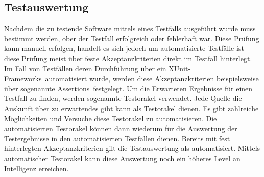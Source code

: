 \subsection{Testauswertung}
\label{subsec:testauswertung}
Nachdem die zu testende Software mittels eines Testfalls ausgeführt wurde muss bestimmt werden, ober der Testfall erfolgreich oder fehlerhaft war. Diese Prüfung kann manuell erfolgen, handelt es sich jedoch um automatisierte Testfälle ist diese Prüfung meist über feste Akzeptanzkriterien direkt im Testfall hinterlegt. Im Fall von Testfällen deren Durchführung über ein \grq XUnit-Frameworks\grq\ automatisiert wurde, werden diese Akzeptanzkriterien beispielsweise über sogenannte \grq Assertions\grq\ festgelegt.
Um die Erwarteten Ergebnisse für einen Testfall zu finden, werden sogenannte Testorakel verwendet.
Jede Quelle die Auskunft über zu erwartendes gibt kann als Testorakel dienen.
Es gibt zahlreiche Möglichkeiten und Versuche diese Testorakel zu automatisieren. \cite{memon_automated_2000} \cite{richardson_specification-based_1992} \cite{shahamiri_comparative_2009}
Die automatisierten Testorakel können dann wiederum für die Auswertung der Testergebnisse in den automatisierten Testfällen dienen.
Bereits mit fest hinterlegten Akzeptanzkriterien gilt die Testauswertung als automatisiert. Mittels automatischer Testorakel kann diese Auswertung noch ein höheres Level an Intelligenz erreichen. \cite[vgl.]{amannejad_search-based_2014}




